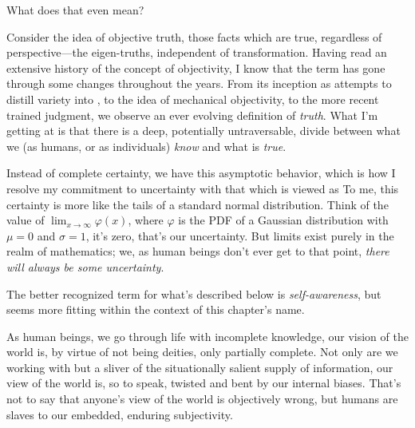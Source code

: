 \documentclass[../butidigress.tex]{subfiles}
\begin{document}
What does that even mean?

Consider the idea of objective truth, those facts which are true, regardless of perspective---the eigen-truths, independent of transformation.
Having read an extensive history of the concept of objectivity, I know that the term has gone through some changes throughout the years\autocite{objectivity}.
From its inception as attempts to distill variety into , to the idea of mechanical objectivity, to the more recent trained judgment, we observe an ever evolving definition of \emph{truth}.
What I'm getting at is that there is a deep, potentially untraversable, divide between what we (as humans, or as individuals) \emph{know} and what is \emph{true}.

Instead of complete certainty, we have this asymptotic behavior, which is how I resolve my commitment to uncertainty with that which is viewed as 
To me, this certainty is more like the tails of a standard normal distribution.
Think of the value of $\lim_{x\to\infty}\varphi(x)$, where $\varphi$ is the PDF of a Gaussian distribution with $\mu = 0$ and $\sigma = 1$, it's zero, that's our uncertainty.
But limits exist purely in the realm of mathematics; we, as human beings don't ever get to that point, \emph{there will always be some uncertainty}.

The better recognized term for what's described below is \emph{self-awareness}, but  seems more fitting within the context of this chapter's name.

As human beings, we go through life with incomplete knowledge, our vision of the world is, by virtue of not being deities, only partially complete.
Not only are we working with but a sliver of the situationally salient supply of information, our view of the world is,  so to speak, twisted and bent by our internal biases.
That's not to say that anyone's view of the world is objectively wrong, but humans are slaves to our embedded, enduring subjectivity.
\end{document}
